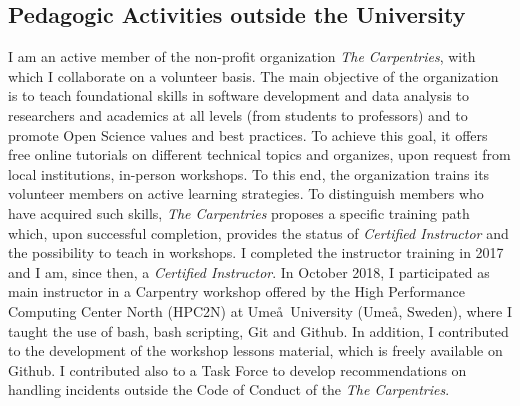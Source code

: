\documentclass[
  a4paper, 
]{fortysecondscv}
\begin{document}
\subsection{Pedagogic Activities outside the University}
I am an active member of the non-profit organization \emph{The Carpentries}, with which I collaborate on a volunteer basis. The main objective of the organization is to teach foundational skills in software development and data analysis to researchers and academics at all levels (from students to professors) and to promote Open Science values and best practices. To achieve this goal, it offers free online tutorials on different technical topics and organizes, upon request from local institutions, in-person workshops. To this end, the organization trains its volunteer members on active learning strategies. To distinguish members who have acquired such skills, \emph{The Carpentries} proposes a specific training path which, upon successful completion, provides the status of \emph{Certified Instructor} and the possibility to teach in workshops. I completed the instructor training in 2017 and I am, since then, a \emph{Certified Instructor}. In October 2018, I participated as main instructor in a Carpentry workshop offered by the High Performance Computing Center North (HPC2N) at Ume\aa\ University (Ume\aa, Sweden), where I taught the use of bash, bash scripting, Git and Github. In addition, I contributed to the development of the workshop lessons material, which is freely available on Github. I contributed also to a Task Force to develop recommendations on handling incidents outside the Code of Conduct of the \emph{The Carpentries}.
\end{document}
